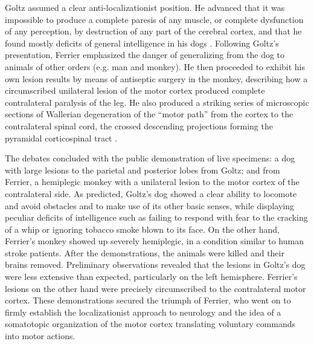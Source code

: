 Goltz assumed a clear anti-localizationist position. He advanced that it was impossible to produce a complete paresis of any muscle, or complete dysfunction of any perception, by destruction of any part of the cerebral cortex, and that he found mostly deficits of general intelligence in his dogs \cite{Tyler2000}. Following Goltz's presentation, Ferrier emphasized the danger of generalizing from the dog to animals of other orders (e.g. man and monkey). He then proceeded to exhibit his own lesion results by means of antiseptic surgery in the monkey, describing how a circumscribed unilateral lesion of the motor cortex produced complete contralateral paralysis of the leg. He also produced a striking series of microscopic sections of Wallerian degeneration \cite{Waller1850} of the ``motor path'' from the cortex to the contralateral spinal cord, the crossed descending projections forming the pyramidal corticospinal tract \cite{Tyler2000}.

The debates concluded with the public demonstration of live specimens: a dog with large lesions to the parietal and posterior lobes from Goltz; and from Ferrier, a hemiplegic monkey with a unilateral lesion to the motor cortex of the contralateral side. As predicted, Goltz's dog showed a clear ability to locomote and avoid obstacles and to make use of its other basic senses, while displaying peculiar deficits of intelligence such as failing to respond with fear to the cracking of a whip or ignoring tobacco smoke blown to its face. On the other hand, Ferrier's monkey showed up severely hemiplegic, in a condition similar to human stroke patients. After the demonstrations, the animals were killed and their brains removed. Preliminary observations revealed that the lesions in Goltz's dog were less extensive than expected, particularly on the left hemisphere. Ferrier's lesions on the other hand were precisely circumscribed to the contralateral motor cortex. These demonstrations secured the triumph of Ferrier, who went on to firmly establish the localizationist approach to neurology and the idea of a somatotopic organization of the motor cortex translating voluntary commands into motor actions.


